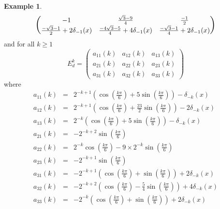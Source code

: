 \documentclass[12pt]{amsart}
\theoremstyle{definition}
\newtheorem{example}[thrm]{Example}
\numberwithin{equation}{section}
\numberwithin{equation}{section}
\begin{document}
\begin{example}
$$\begin{pmatrix}
-1&\frac{\sqrt{3}-9}{4}&\frac{-1}{2}\vspace*{0.1pc}\\\frac{-\sqrt{3}-1}{2}+2\delta_{-1}(x)&\frac{-4\sqrt{3}-5}{4}+4\delta_{-1}(x)&
\frac{-\sqrt{3}-1}{4}+2\delta_{-1}(x)\end{pmatrix}$$
and for all $k\geq1$
$$E_{d}^{k}=\begin{pmatrix}
a_{11}(k)&a_{12}(k)&a_{13}(k)\\a_{21}(k)&a_{22}(k)&a_{23}(k)\\a_{31}(k)&a_{32}(k)&a_{33}(k)
\end{pmatrix}$$
where
\begin{eqnarray*}
a_{11}(k)&=&2^{-k+1}(\cos(\frac{k\pi}{6})+5\sin(\frac{k\pi}{6}))-\delta_{-k}(x)\\
a_{12}(k)&=&2^{-k+1}(\cos(\frac{k\pi}{6})+\frac{23}{2}\sin(\frac{k\pi}{6}))-2\delta_{-k}(x)\\
a_{13}(k)&=&2^{-k}(\cos(\frac{k\pi}{6})+5\sin(\frac{k\pi}{6}))-\delta_{-k}(x)\\
a_{21}(k)&=&-2^{-k+2}\sin(\frac{k\pi}{6})\\
a_{22}(k)&=&2^{-k}\cos(\frac{k\pi}{6})-9\times2^{-k}\sin(\frac{k\pi}{6})\\
a_{23}(k)&=&-2^{-k+1}\sin(\frac{k\pi}{6})\\
a_{31}(k)&=&-2^{-k+1}(\cos(\frac{k\pi}{6})+\sin(\frac{k\pi}{6}))+2\delta_{-k}(x)\\
a_{32}(k)&=&-2^{-k+2}(\cos(\frac{k\pi}{6})-\frac{5}{4}\sin(\frac{k\pi}{6}))+4\delta_{-k}(x)\\
a_{33}(k)&=&-2^{-k}(\cos(\frac{k\pi}{6})+\sin(\frac{k\pi}{6}))+2\delta_{-k}(x)
\end{eqnarray*}
\end{example}
\end{document}
